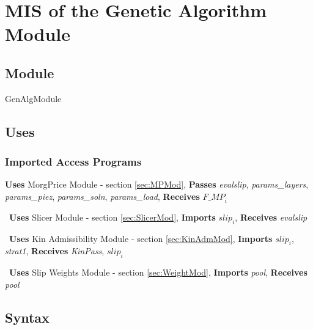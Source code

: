 \documentclass[12pt, titlepage]{article}
\begin{document}

\section{MIS of the Genetic Algorithm Module} \label{sec:GenAlgMod}

\subsection{Module}
GenAlgModule

\subsection{Uses}

\subsubsection{Imported Access Programs}
\noindent
\textbf{Uses} MorgPrice Module - section \ref{sec:MPMod},
\textbf{Passes} \textit{evalslip}, \textit{params\_layers},
\textit{params\_piez}, \textit{params\_soln}, 
\textit{params\_load}, \textbf{Receives} $\textit{F\_MP}_{i}$

~\newline\noindent \textbf{Uses} Slicer Module - section
\ref{sec:SlicerMod}, \textbf{Imports} $\textit{slip}_{i}$,
\textbf{Receives} \textit{evalslip}

~\newline\noindent \textbf{Uses} Kin Admissibility Module - section
\ref{sec:KinAdmMod}, \textbf{Imports} $\textit{slip}_{i}$,
\textit{strat1}, \textbf{Receives} \textit{KinPass},
$\textit{slip}_{i}$

~\newline\noindent \textbf{Uses} Slip Weights Module - section
\ref{sec:WeightMod}, \textbf{Imports} \textit{pool}, \textbf{Receives}
\textit{pool}

\subsection{Syntax}
\end{document}
